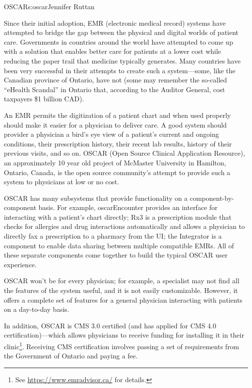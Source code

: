 \begin{aosachapter}{OSCAR}{s:oscar}{Jennifer Ruttan}

Since their initial adoption, EMR (electronic medical record) systems
have attempted to bridge the gap between the physical and digital
worlds of patient care. Governments in countries around the world have
attempted to come up with a solution that enables better care for
patients at a lower cost while reducing the paper trail that medicine
typically generates. Many countries have been very successful in their
attempts to create such a system---some, like the Canadian province of
Ontario, have not (some may remember the so-called ``eHealth Scandal''
in Ontario that, according to the Auditor General, cost taxpayers \$1
billion CAD).

An EMR permits the digitization of a patient chart and when used
properly should make it easier for a physician to deliver care. A good
system should provider a physician a bird's eye view of a patient's
current and ongoing conditions, their prescription history, their
recent lab results, history of their previous visits, and so on. OSCAR
(Open Source Clinical Application Resource), an approximately
10 year old project of McMaster University in Hamilton, Ontario,
Canada, is the open source community's attempt to provide such a system
to physicians at low or no cost.

OSCAR has many subsystems that provide functionality on a
component-by-component basis. For example, oscarEncounter provides an
interface for interacting with a patient's chart directly; Rx3 is a
prescription module that checks for allergies and drug interactions
automatically and allows a physician to directly fax a prescription to
a pharmacy from the UI; the Integrator is a component to enable data
sharing between multiple compatible EMRs. All of these separate
components come together to build the typical OSCAR user experience.

OSCAR won't be for every physician; for example, a specialist may not
find all the features of the system useful, and it is not easily
customizable. However, it offers a complete set of features for a
general physician interacting with patients on a day-to-day basis.

In addition, OSCAR is CMS 3.0 certified (and has applied for CMS 4.0
certification)---which allows physicians to receive funding for
installing it in their
clinic\footnote{See \url{https://www.emradvisor.ca/} for
details.}. Receiving CMS certification involves passing a set of
requirements from the Government of Ontario and paying a fee.


\end{aosachapter}
